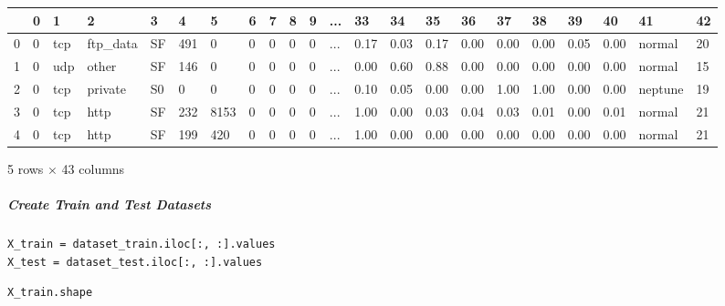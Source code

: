 \bigskip\noindent
\begin{tabular}{p{}p{}p{}p{}p{}p{}p{}p{}p{}p{}p{}p{}p{}p{}p{}p{}p{}p{}p{}p{}p{}p{}}
\toprule
 & 0 & 1 & 2 & 3 & 4 & 5 & 6 & 7 & 8 & 9 & ... & 33 & 34 & 35 & 36 & 37 & 38 & 39 & 40 & 41 & 42 \\
\hline
0 & 0 & tcp & ftp\_data & SF & 491 & 0 & 0 & 0 & 0 & 0 & ... & 0.17 & 0.03 & 0.17 & 0.00 & 0.00 & 0.00 & 0.05 & 0.00 & normal & 20 \\
\hline
1 & 0 & udp & other & SF & 146 & 0 & 0 & 0 & 0 & 0 & ... & 0.00 & 0.60 & 0.88 & 0.00 & 0.00 & 0.00 & 0.00 & 0.00 & normal & 15 \\
\hline
2 & 0 & tcp & private & S0 & 0 & 0 & 0 & 0 & 0 & 0 & ... & 0.10 & 0.05 & 0.00 & 0.00 & 1.00 & 1.00 & 0.00 & 0.00 & neptune & 19 \\
\hline
3 & 0 & tcp & http & SF & 232 & 8153 & 0 & 0 & 0 & 0 & ... & 1.00 & 0.00 & 0.03 & 0.04 & 0.03 & 0.01 & 0.00 & 0.01 & normal & 21 \\
\hline
4 & 0 & tcp & http & SF & 199 & 420 & 0 & 0 & 0 & 0 & ... & 1.00 & 0.00 & 0.00 & 0.00 & 0.00 & 0.00 & 0.00 & 0.00 & normal & 21 \\
\hline
\bottomrule
\end{tabular}

\bigskip

5 rows $\times$ 43 columns

\subparagraph{Create Train and Test Datasets}

\begin{verbatim}
X_train = dataset_train.iloc[:, :].values
X_test = dataset_test.iloc[:, :].values
\end{verbatim}

\begin{verbatim}
X_train.shape
\end{verbatim}

